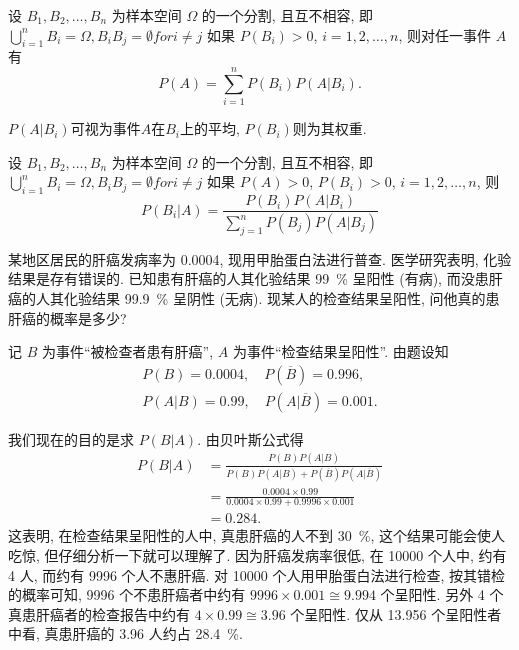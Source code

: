 \begin{theorem}[全概率公式]
    设 $B_1, B_2, \dotsc, B_n$ 为样本空间 $\Omega$ 的一个分割, 且互不相容, 即$\bigcup _{i=1} ^n B_i = \Omega, B_i B_j= \emptyset for i \neq j $
    如果 $P(B_i) > 0$, $i=1, 2, \dotsc, n$,
    则对任一事件 $A$ 有
    \begin{equation}
        P(A) = \sum_{i=1}^n P(B_i) P(A | B_i).
    \end{equation}
\end{theorem}

\begin{note}
    $P(A | B_i)$可视为事件$A$在$B_i$上的平均, $P(B_i)$则为其权重.
\end{note}

\begin{theorem}[Bayes定理]
    设 $B_1, B_2, \dotsc, B_n$ 为样本空间 $\Omega$ 的一个分割, 且互不相容, 即$\bigcup _{i=1} ^n B_i = \Omega, B_i B_j= \emptyset for i \neq j $
    如果 $P(A) > 0$, $P(B_i) > 0$, $i = 1,2, \dotsc, n$,
    则
    \begin{equation}
        P (B_i | A) = \frac{P(B_i) P(A|B_i)}{\sum_{j=1}^n P(B_j) P(A|B_j)}
    \end{equation}
\end{theorem}

\begin{example}
    某地区居民的肝癌发病率为 \num{0.0004},
    现用甲胎蛋白法进行普查.
    医学研究表明,
    化验结果是存有错误的.
    已知患有肝癌的人其化验结果 \SI{99}{\percent} 呈阳性 (有病),
    而没患肝癌的人其化验结果 \SI{99.9}{\percent} 呈阴性 (无病).
    现某人的检查结果呈阳性,
    问他真的患肝癌的概率是多少?
\end{example}

\begin{solution}
    记 $B$ 为事件“被检查者患有肝癌”,
    $A$ 为事件“检查结果呈阳性”.
    由题设知
    \begin{gather*}
        P(B) = 0.0004, \quad P(\overline{B}) = 0.996,\\
        P(A|B) = 0.99, \quad P(A|\overline{B}) = 0.001.
    \end{gather*}

    我们现在的目的是求 $P(B|A)$.
    由贝叶斯公式得
    \begin{align*}
        P(B|A) & = \frac{P(B) P(A|B)}{P(B) P(A|B) + P(\overline{B}) P(A|\overline{B})} \\
               & = \frac{0.0004 \times 0.99}{0.0004 \times 0.99 + 0.9996 \times 0.001} \\
               & = 0.284.
    \end{align*}
    这表明,
    在检查结果呈阳性的人中,
    真患肝癌的人不到 \SI{30}{\percent},
    这个结果可能会使人吃惊,
    但仔细分析一下就可以理解了.
    因为肝癌发病率很低,
    在 \num{10000} 个人中,
    约有 4 人,
    而约有 \num{9996} 个人不惠肝癌.
    对 \num{10000} 个人用甲胎蛋白法进行检查,
    按其错检的概率可知,
    \num{9996} 个不患肝癌者中约有 $9996 \times 0.001 \cong 9.994$ 个呈阳性.
    另外 4 个真患肝癌者的检查报告中约有 $4 \times 0.99 \cong 3.96 $ 个呈阳性.
    仅从 \num{13.956} 个呈阳性者中看,
    真患肝癌的 3.96 人约占 \SI{28.4}{\percent}.
\end{solution}

